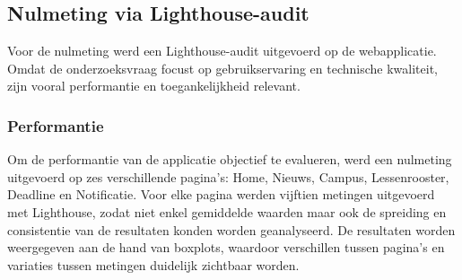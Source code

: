 \subsection{Nulmeting via Lighthouse-audit}
\label{subsec:nulmeting-lighthouse}

Voor de nulmeting werd een Lighthouse-audit uitgevoerd op de webapplicatie. Omdat de onderzoeksvraag focust op gebruikservaring en technische kwaliteit, zijn vooral performantie en toegankelijkheid relevant.

\subsubsection{Performantie}
Om de performantie van de applicatie objectief te evalueren, werd een nulmeting uitgevoerd op zes verschillende pagina’s: Home, Nieuws, Campus, Lessenrooster, Deadline en Notificatie. Voor elke pagina werden vijftien metingen uitgevoerd met Lighthouse, zodat niet enkel gemiddelde waarden maar ook de spreiding en consistentie van de resultaten konden worden geanalyseerd. De resultaten worden weergegeven aan de hand van boxplots, waardoor verschillen tussen pagina’s en variaties tussen metingen duidelijk zichtbaar worden.

